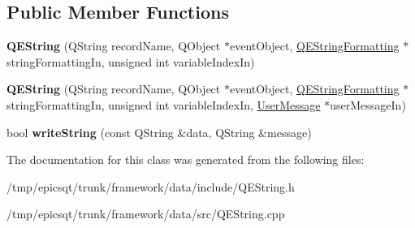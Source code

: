 \subsection*{Public Member Functions}
\begin{DoxyCompactItemize}
\item 
\hypertarget{classQEString_ac6ddd3ccf8e1ba581d8f88b813cfd19f}{
{\bfseries QEString} (QString recordName, QObject $\ast$eventObject, \hyperlink{classQEStringFormatting}{QEStringFormatting} $\ast$stringFormattingIn, unsigned int variableIndexIn)}
\label{classQEString_ac6ddd3ccf8e1ba581d8f88b813cfd19f}

\item 
\hypertarget{classQEString_a003299b6fbc829c7b586e7213d83697c}{
{\bfseries QEString} (QString recordName, QObject $\ast$eventObject, \hyperlink{classQEStringFormatting}{QEStringFormatting} $\ast$stringFormattingIn, unsigned int variableIndexIn, \hyperlink{classUserMessage}{UserMessage} $\ast$userMessageIn)}
\label{classQEString_a003299b6fbc829c7b586e7213d83697c}

\item 
\hypertarget{classQEString_ab0d3f164579b23ea546441fa71a405d5}{
bool {\bfseries writeString} (const QString \&data, QString \&message)}
\label{classQEString_ab0d3f164579b23ea546441fa71a405d5}

\end{DoxyCompactItemize}


The documentation for this class was generated from the following files:\begin{DoxyCompactItemize}
\item 
/tmp/epicsqt/trunk/framework/data/include/QEString.h\item 
/tmp/epicsqt/trunk/framework/data/src/QEString.cpp\end{DoxyCompactItemize}
